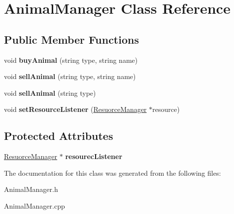 \hypertarget{class_animal_manager}{}\section{Animal\+Manager Class Reference}
\label{class_animal_manager}
\subsection*{Public Member Functions}
\begin{DoxyCompactItemize}
\item 
\mbox{\label{class_animal_manager_a0c047e132bf297a8ecbe153783c7928f}} 
void {\bfseries buy\+Animal} (string type, string name)
\item 
\mbox{\label{class_animal_manager_a0706166b7609abae09369aedd309453e}} 
void {\bfseries sell\+Animal} (string type, string name)
\item 
\mbox{\label{class_animal_manager_ae81755971c331f3539a6bfd83e8f5d33}} 
void {\bfseries sell\+Animal} (string type)
\item 
\mbox{\label{class_animal_manager_abc80d5035e94b824a4e331f64650601c}} 
void {\bfseries set\+Resource\+Listener} (\hyperlink{class_resuorce_manager}{Resuorce\+Manager} $\ast$resource)
\end{DoxyCompactItemize}
\subsection*{Protected Attributes}
\begin{DoxyCompactItemize}
\item 
\mbox{\label{class_animal_manager_a9ce4750d75067cd65b1f884605b021d8}} 
\hyperlink{class_resuorce_manager}{Resuorce\+Manager} $\ast$ {\bfseries resourec\+Listener}
\end{DoxyCompactItemize}


The documentation for this class was generated from the following files\+:\begin{DoxyCompactItemize}
\item 
Animal\+Manager.\+h\item 
Animal\+Manager.\+cpp\end{DoxyCompactItemize}
